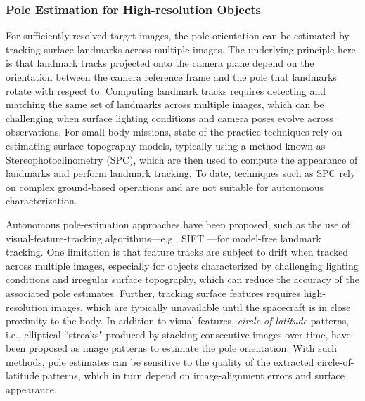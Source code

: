 \subsubsection{Pole Estimation for High-resolution Objects}

For sufficiently resolved target images, the pole orientation can be estimated by tracking surface landmarks across multiple images. The underlying principle here is that landmark tracks projected onto the camera plane depend on the orientation between the camera reference frame and the pole that landmarks rotate with respect to. Computing landmark tracks requires detecting and matching the same set of landmarks across multiple images, which can be challenging when surface lighting conditions and camera poses evolve across observations. For small-body missions, state-of-the-practice techniques rely on estimating surface-topography models, typically using a method known as Stereophotoclinometry (SPC)\cite{palmer2022practical,adam2023stereophotoclinometry}, which are then used to compute the appearance of landmarks and perform landmark tracking. To date, techniques such as SPC rely on complex ground-based operations and are not suitable for autonomous characterization.

Autonomous pole-estimation approaches have been proposed, such as the use of visual-feature-tracking algorithms---e.g., SIFT \cite{lowe2004distinctive}---for model-free landmark tracking\cite{panicucci2023vision,villa2020optical}. One limitation is that feature tracks are subject to drift when tracked across multiple images, especially for objects characterized by challenging lighting conditions and irregular surface topography\cite{morrell2020autonomous}, which can reduce the accuracy of the associated pole estimates. Further, tracking surface features requires high-resolution images, which are typically unavailable until the spacecraft is in close proximity to the body. In addition to visual features, \textit{circle-of-latitude} patterns, i.e., elliptical ``streaks" produced by stacking consecutive images over time, have been proposed as image patterns to estimate the pole orientation\cite{kuppa2024initial,christian2024pole}. With such methods, pole estimates can be sensitive to the quality of the extracted circle-of-latitude patterns, which in turn depend on image-alignment errors and surface appearance.